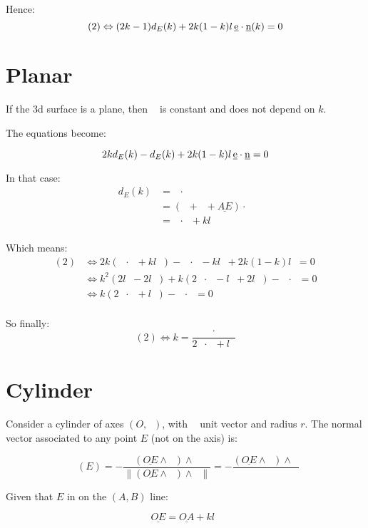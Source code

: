 \documentclass[10pt,a4paper]{article}
\newcommand{\ud}[1]{\underline{#1}}
\DeclareMathOperator{\cross}{\wedge}
\DeclareMathOperator{\DE}{\ud{DE}}
\DeclareMathOperator{\DC}{\ud{DC}}
\DeclareMathOperator{\CA}{\ud{CA}}
\DeclareMathOperator{\z}{\ud{z}}
\DeclareMathOperator{\e}{\ud{e}}
\DeclareMathOperator{\n}{\ud{n}}
\DeclareMathOperator{\en}{\ud{e}\cdot\ud{n}}
\DeclareMathOperator{\OEz}{\|\ud{OE} \cross \z\|}
\begin{document}
Hence:
$$
(2) \Leftrightarrow (2k - 1)d_E(k) + 2k(1-k)l\en(k) = 0\\
$$

\newpage
\section{Planar}

If the 3d surface is a plane, then $\n$ is constant and does not depend on $k$.

The equations become:

\begin{equation}
    2kd_E(k) - d_E(k) + 2k(1-k)l\en = 0\\
\end{equation}

In that case:
$$
\begin{array}{ll}
    d_E(k)
    & = \DE \cdot \n\\
    & = \left( \DC + \CA + \ud{AE} \right) \cdot \n\\
    & = \CA \cdot \n + kl \en\\
\end{array}
$$

Which means:
$$
\begin{array}{ll}
    (2)
    & \Leftrightarrow
    2k(\CA \cdot \n + kl\en) - \CA \cdot \n - kl \en + 2k(1-k)l\en = 0\\
    & \Leftrightarrow
    k^2(2l\en - 2l\en) + k(2\CA \cdot \n - l\en + 2l\en) - \CA \cdot \n = 0\\
    & \Leftrightarrow
    k(2\CA \cdot \n + l\en) - \CA \cdot \n = 0\\
\end{array}
$$

So finally:
$$
(2) \Leftrightarrow k = \frac{\CA \cdot \n}{2\CA \cdot \n + l\en}
$$

\newpage
\section{Cylinder}

Consider a cylinder of axes $(O, \z)$, with $\z$  unit vector and radius $r$.
The normal vector associated to any point $E$ (not on the axis) is:

$$
\n(E) = - \frac{(\ud{OE} \cross  \z) \cross \z}{
    \|(\ud{OE} \cross  \z) \cross \z\|
}
    = - \frac{(\ud{OE} \cross  \z) \cross \z}{\OEz}
$$

Given that $E$ in on the $(A, B)$ line:

$$
\ud{OE} = \ud{OA} + kl\e
$$
\end{document}
